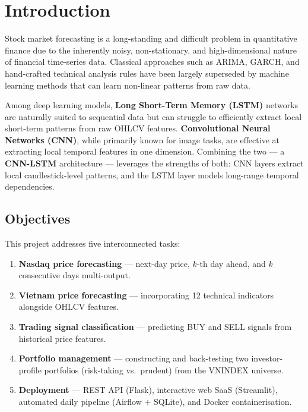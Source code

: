 \documentclass[12pt,a4paper]{article}
\begin{document}
\section{Introduction}

Stock market forecasting is a long-standing and difficult problem in quantitative
finance due to the inherently noisy, non-stationary, and high-dimensional nature
of financial time-series data. Classical approaches such as ARIMA, GARCH, and
hand-crafted technical analysis rules have been largely superseded by machine
learning methods that can learn non-linear patterns from raw data.

Among deep learning models, \textbf{Long Short-Term Memory (LSTM)} networks are
naturally suited to sequential data but can struggle to efficiently extract local
short-term patterns from raw OHLCV features. \textbf{Convolutional Neural
Networks (CNN)}, while primarily known for image tasks, are effective at
extracting local temporal features in one dimension. Combining the two --- a
\textbf{CNN-LSTM} architecture --- leverages the strengths of both: CNN layers
extract local candlestick-level patterns, and the LSTM layer models long-range
temporal dependencies.

\subsection{Objectives}

This project addresses five interconnected tasks:

\begin{enumerate}[leftmargin=2em]
  \item \textbf{Nasdaq price forecasting} --- next-day price, $k$-th day ahead,
        and $k$ consecutive days multi-output.
  \item \textbf{Vietnam price forecasting} --- incorporating 12 technical
        indicators alongside OHLCV features.
  \item \textbf{Trading signal classification} --- predicting BUY and SELL
        signals from historical price features.
  \item \textbf{Portfolio management} --- constructing and back-testing two
        investor-profile portfolios (risk-taking vs.\ prudent) from the VNINDEX
        universe.
  \item \textbf{Deployment} --- REST API (Flask), interactive web SaaS
        (Streamlit), automated daily pipeline (Airflow + SQLite), and Docker
        containerisation.
\end{enumerate}
\end{document}

